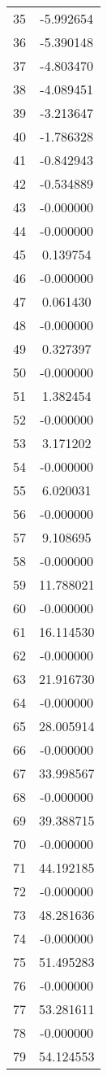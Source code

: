 \documentclass[12pt]{article}
\begin{document}
\begin{longtable}{@{}cc@{}}
35 & -5.992654 \\
36 & -5.390148 \\
37 & -4.803470 \\
38 & -4.089451 \\
39 & -3.213647 \\
40 & -1.786328 \\
41 & -0.842943 \\
42 & -0.534889 \\
43 & -0.000000 \\
44 & -0.000000 \\
45 & 0.139754 \\
46 & -0.000000 \\
47 & 0.061430 \\
48 & -0.000000 \\
49 & 0.327397 \\
50 & -0.000000 \\
51 & 1.382454 \\
52 & -0.000000 \\
53 & 3.171202 \\
54 & -0.000000 \\
55 & 6.020031 \\
56 & -0.000000 \\
57 & 9.108695 \\
58 & -0.000000 \\
59 & 11.788021 \\
60 & -0.000000 \\
61 & 16.114530 \\
62 & -0.000000 \\
63 & 21.916730 \\
64 & -0.000000 \\
65 & 28.005914 \\
66 & -0.000000 \\
67 & 33.998567 \\
68 & -0.000000 \\
69 & 39.388715 \\
70 & -0.000000 \\
71 & 44.192185 \\
72 & -0.000000 \\
73 & 48.281636 \\
74 & -0.000000 \\
75 & 51.495283 \\
76 & -0.000000 \\
77 & 53.281611 \\
78 & -0.000000 \\
79 & 54.124553 \\

\end{longtable}
\end{document}
